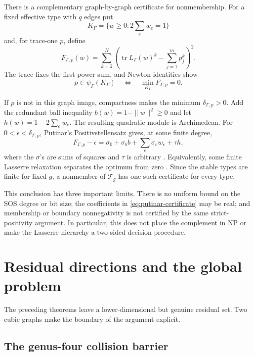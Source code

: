 \documentclass[11pt,reqno]{amsart}
\theoremstyle{definition}
\theoremstyle{remark}
\newcommand{\tr}{\operatorname{tr}}
\begin{document}
There is a complementary graph-by-graph certificate for nonmembership.  For
a fixed effective type with $q$ edges put
\[
 K_\Gamma=\{w\ge0:2\sum_ew_e=1\}
\]
and, for trace-one $p$, define
\begin{equation}\label{eq:moment-objective}
 F_{\Gamma,p}(w)=
 \sum_{k=2}^{N}\left(
    \tr L_\Gamma(w)^k-\sum_{j=1}^{m}p_j^k
 \right)^2.
\end{equation}
The trace fixes the first power sum, and Newton identities show
\begin{equation}\label{eq:moment-membership}
 p\in\psi_\Gamma(K_\Gamma)
 \quad\Longleftrightarrow\quad
 \min_{K_\Gamma}F_{\Gamma,p}=0.
\end{equation}

If $p$ is not in this graph image, compactness makes the minimum
$\delta_{\Gamma,p}>0$.  Add the redundant ball inequality
$b(w)=1-\|w\|^2\ge0$ and let $h(w)=1-2\sum_ew_e$.  The resulting quadratic
module is Archimedean.  For $0<\epsilon<\delta_{\Gamma,p}$, Putinar's
Positivstellensatz gives, at some finite degree,
\begin{equation}\label{eq:putinar-certificate}
 F_{\Gamma,p}-\epsilon
 =\sigma_0+\sigma_bb+\sum_e\sigma_ew_e+\tau h,
\end{equation}
where the $\sigma$'s are sums of squares and $\tau$ is arbitrary
\cite{Putinar1993}.  Equivalently, some finite Lasserre relaxation separates
the optimum from zero \cite{Lasserre2001}.  Since the stable types are finite
for fixed $g$, a nonmember of $\mathcal T_g$ has one such certificate for
every type.

This conclusion has three important limits.  There is no uniform bound on
the SOS degree or bit size; the coefficients in
\eqref{eq:putinar-certificate} may be real; and membership or boundary
nonnegativity is not certified by the same strict-positivity argument.  In
particular, this does not place the complement in $\mathrm{NP}$ or make the
Lasserre hierarchy a two-sided decision procedure.

\section{Residual directions and the global problem}\label{sec:residual}

The preceding theorems leave a lower-dimensional but genuine residual set.
Two cubic graphs make the boundary of the argument explicit.

\subsection{The genus-four collision barrier}
\end{document}
